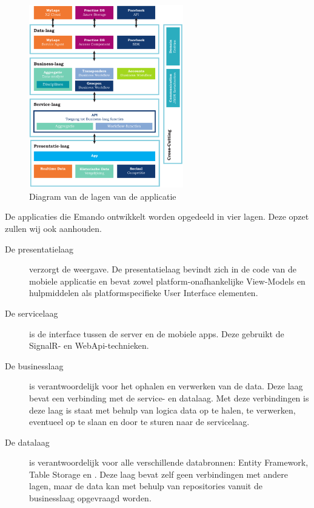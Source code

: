 \begin{figure}
  \includegraphics[width=0.6\textwidth]{style/images/Layers}
  \caption{Diagram van de lagen van de applicatie}
  \label{fig:diagram-layers}
\end{figure}

De applicaties die Emando ontwikkelt worden opgedeeld in vier lagen. Deze opzet zullen wij ook aanhouden.

\begin{description}
\item[De presentatielaag] verzorgt de weergave. De presentatielaag bevindt zich in de code van de mobiele applicatie en bevat zowel platform-onafhankelijke View-Models en hulpmiddelen als platformspecifieke User Interface elementen.
\item[De servicelaag] is de interface tussen de server en de mobiele apps. Deze gebruikt de SignalR- en WebApi-technieken.
\item[De businesslaag] is verantwoordelijk voor het ophalen en verwerken van de data. Deze laag bevat een verbinding met de service- en datalaag. Met deze verbindingen is deze laag is staat met behulp van logica data op te halen, te verwerken, eventueel op te slaan en door te sturen naar de servicelaag. 
\item[De datalaag] is verantwoordelijk voor alle verschillende databronnen: Entity Framework, Table Storage en \mylaps. Deze laag bevat zelf geen verbindingen met andere lagen, maar de data kan met behulp van repositories vanuit de businesslaag opgevraagd worden.

\end{description}


